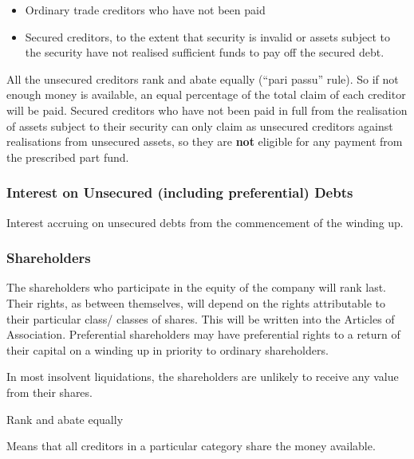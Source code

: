 \documentclass[
]{article}
\providecommand{\tightlist}{%
  \setlength{\itemsep}{0pt}\setlength{\parskip}{0pt}}
\newenvironment{env-751485c0-9cbb-4b3b-8497-6bad2ef120e5}
{
    \savenotes\tcolorbox[blanker,breakable,left=5pt,borderline west={2pt}{-4pt}{gold}]
}
{
    \endtcolorbox\spewnotes
}
\begin{document}
\begin{itemize}
\tightlist
\item
  Ordinary trade creditors who have not been paid
\item
  Secured creditors, to the extent that security is invalid or assets
  subject to the security have not realised sufficient funds to pay off
  the secured debt.
\end{itemize}

All the unsecured creditors rank and abate equally (``pari passu''
rule). So if not enough money is available, an equal percentage of the
total claim of each creditor will be paid. Secured creditors who have
not been paid in full from the realisation of assets subject to their
security can only claim as unsecured creditors against realisations from
unsecured assets, so they are \textbf{not} eligible for any payment from
the prescribed part fund.

\hypertarget{interest-on-unsecured-including-preferential-debts}{%
\subsubsection{Interest on Unsecured (including preferential)
Debts}\label{interest-on-unsecured-including-preferential-debts}}

Interest accruing on unsecured debts from the commencement of the
winding up.

\hypertarget{shareholders}{%
\subsubsection{Shareholders}\label{shareholders}}

The shareholders who participate in the equity of the company will rank
last. Their rights, as between themselves, will depend on the rights
attributable to their particular class/ classes of shares. This will be
written into the Articles of Association. Preferential shareholders may
have preferential rights to a return of their capital on a winding up in
priority to ordinary shareholders.

In most insolvent liquidations, the shareholders are unlikely to receive
any value from their shares.

\begin{env-751485c0-9cbb-4b3b-8497-6bad2ef120e5}

Rank and abate equally

Means that all creditors in a particular category share the money
available.

\end{env-751485c0-9cbb-4b3b-8497-6bad2ef120e5}
\end{document}
